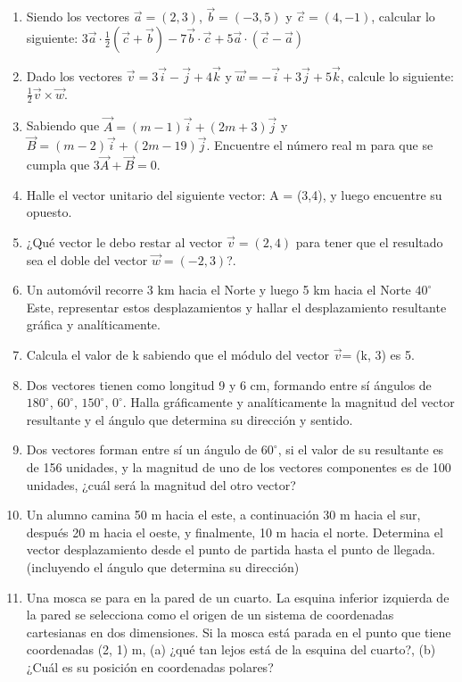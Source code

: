 \documentclass[a5paper,pagesize,10pt,bibtotoc,pointlessnumbers,
normalheadings,DIV=9,fleqn,x11names,table,twoside=false]{scrbook}
\begin{document}
\begin{enumerate}
\item Siendo los vectores $\vec{a} = (2,3)$, $\vec{b} = (-3,5)$ y $\vec{c} = (4,-1)$, calcular lo siguiente: 
$3\vec{a}\cdot\frac{1}{2}(\vec{c}+\vec{b})-7\vec{b}\cdot\vec{c}+5\vec{a}\cdot(\vec{c}-\vec{a})$ 

\item Dado los vectores $\vec{v} = 3\vec{i}-\vec{j}+4\vec{k}$ y $\vec{w}=-\vec{i}+3\vec{j}+5\vec{k}$, calcule lo 
siguiente: $\frac{1}{2}\vec{v}\times\vec{w}$.

\item Sabiendo que $\vec{A} = (m - 1) \vec{i} + (2 m + 3) \vec{j}$ y $\vec{B} = (m - 2) \vec{i} + (2 m - 19) \vec{j}$. 
Encuentre el número real m para que se cumpla que $3 \vec{A} + \vec{B} = 0$.

\item Halle el vector unitario del siguiente vector: A = (3,4), y luego encuentre su opuesto.

\item ¿Qué vector le debo restar al vector $\vec{v} = (2,4)$ para tener que el resultado sea el doble del vector $\vec{w} = 
(-2,3)$?.

\item Un automóvil recorre 3 km hacia el Norte y luego 5 km hacia el Norte $40^\circ$ Este, representar estos desplazamientos y 
hallar el desplazamiento resultante gráfica y analíticamente.

\item Calcula el valor de k sabiendo que el módulo del vector $\vec{v}$= (k, 3) es 5.

\item Dos vectores tienen como longitud 9 y 6 cm, formando entre sí ángulos de $180^\circ$, $60^\circ$, $150^\circ$, $0^\circ$. 
Halla gráficamente y analíticamente la magnitud del vector resultante y el ángulo que determina su dirección y sentido.

\item Dos vectores forman entre sí un ángulo de $60^\circ$, si el valor de su resultante es de 156 unidades, y la magnitud de uno 
de los vectores componentes es de 100 unidades, ¿cuál será la magnitud del otro vector?

\item Un alumno camina 50 m hacia el este, a continuación 30 m hacia el sur, después 20 m hacia el oeste, y finalmente, 10 m 
hacia el norte. Determina el vector desplazamiento desde el punto de partida hasta el punto de llegada. (incluyendo el ángulo que 
determina su dirección)

\item Una mosca se para en la pared de un cuarto. La esquina inferior izquierda de la pared se selecciona como el origen de un 
sistema de coordenadas cartesianas en dos dimensiones. Si la mosca está parada en el punto que tiene coordenadas (2, 1) m, (a) 
¿qué tan lejos está de la esquina del cuarto?, (b) ¿Cuál es su posición en coordenadas polares?

\end{enumerate}
\end{document}
